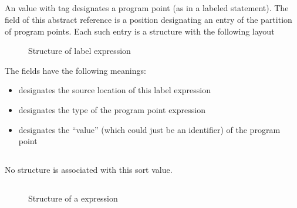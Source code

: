

\subsection{}
\label{sec:ifc:ExprSort:Label}

An  value with tag  designates a program point (as in a labeled statement).
The  field of this abstract reference is a position designating an entry of the partition
of program points.  Each such entry is a structure with the following layout
%
\begin{figure}[H]
	\centering
	\caption{Structure of label expression}
	\label{fig:ifc:ExprSort:Label}
\end{figure}
%
The fields have the following meanings:
\begin{itemize}
	\item {} designates the source location of this label expression
	\item {} designates the type of the program point expression
	\item {} designates the ``value'' (which could just be an identifier) of the program point
\end{itemize}




\subsection{}
\label{sec:ifc:ExprSort:Unused0}

No structure is associated with this sort value.

\subsection{}
\label{sec:ifc:ExprSort:Typeid}

\begin{figure}[H]
	\centering
	\caption{Structure of a  expression}
	\label{fig:ifc-typeid-structure}
\end{figure}

